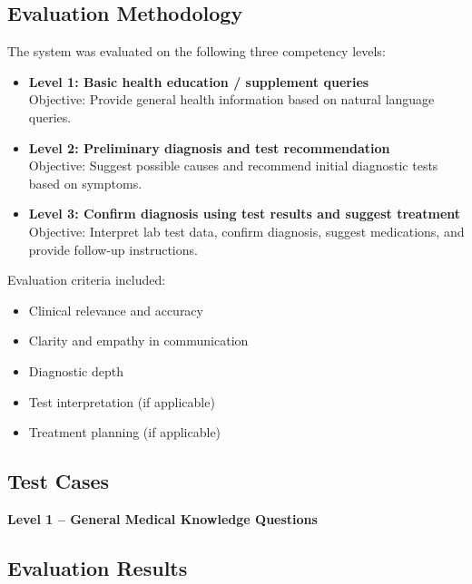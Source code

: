 \documentclass[12pt,a4paper]{report}
\begin{document}
\subsection{Evaluation Methodology}
\label{Evaluation Methodology}

The system was evaluated on the following three competency levels:

\begin{itemize}
    \item \textbf{Level 1: Basic health education / supplement queries} \\
    Objective: Provide general health information based on natural language queries.
    
    \item \textbf{Level 2: Preliminary diagnosis and test recommendation} \\
    Objective: Suggest possible causes and recommend initial diagnostic tests based on symptoms.
    
    \item \textbf{Level 3: Confirm diagnosis using test results and suggest treatment} \\
    Objective: Interpret lab test data, confirm diagnosis, suggest medications, and provide follow-up instructions.
\end{itemize}

Evaluation criteria included:

\begin{itemize}
    \item Clinical relevance and accuracy
    \item Clarity and empathy in communication
    \item Diagnostic depth
    \item Test interpretation (if applicable)
    \item Treatment planning (if applicable)
\end{itemize}

\subsection{Test Cases}
\label{Test Cases}

\textbf{Level 1 – General Medical Knowledge Questions}

\subsection{Evaluation Results}
\label{Evaluation Results}
\end{document}
